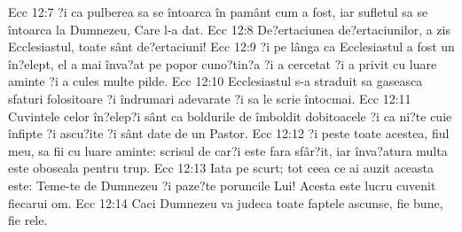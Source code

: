 Ecc 12:7  ?i ca pulberea sa se întoarca în pamânt cum a fost, iar sufletul sa se întoarca la Dumnezeu, Care l-a dat.
Ecc 12:8  De?ertaciunea de?ertaciunilor, a zis Ecclesiastul, toate sânt de?ertaciuni!
Ecc 12:9  ?i pe lânga ca Ecclesiastul a fost un în?elept, el a mai înva?at pe popor cuno?tin?a ?i a cercetat ?i a privit cu luare aminte ?i a cules multe pilde.
Ecc 12:10  Ecclesiastul s-a straduit sa gaseasca sfaturi folositoare ?i îndrumari adevarate ?i sa le scrie întocmai.
Ecc 12:11  Cuvintele celor în?elep?i sânt ca boldurile de îmboldit dobitoacele ?i ca ni?te cuie înfipte ?i ascu?ite ?i sânt date de un Pastor.
Ecc 12:12  ?i peste toate acestea, fiul meu, sa fii cu luare aminte: scrisul de car?i este fara sfâr?it, iar înva?atura multa este oboseala pentru trup.
Ecc 12:13  Iata pe scurt; tot ceea ce ai auzit aceasta este: Teme-te de Dumnezeu ?i paze?te poruncile Lui! Acesta este lucru cuvenit fiecarui om.
Ecc 12:14  Caci Dumnezeu va judeca toate faptele ascunse, fie bune, fie rele.


